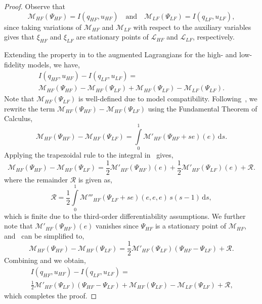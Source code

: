 \documentclass[review,sort&compress]{elsarticle}
\theoremstyle{plain} %
\theoremstyle{definition} %
\providecommand{\DIFaddtex}[1]{{\protect\color{blue} \sf #1}} %
\providecommand{\DIFaddbegin}{} %
\providecommand{\DIFaddend}{} %
\providecommand{\DIFadd}[1]{\texorpdfstring{\DIFaddtex{#1}}{#1}} %
\newcommand{\DIFaddincludegraphics}[2][]{{\color{blue}\fbox{\DIFOincludegraphics[#1]{#2}}}} %
\DeclareRobustCommand{\DIFaddbegin}{\DIFOaddbegin \let\includegraphics\DIFaddincludegraphics} %
\DeclareRobustCommand{\DIFaddend}{\DIFOaddend \let\includegraphics\DIFOincludegraphics} %
\begin{document}
%
\begin{proof}
%
Observe that
%
\begin{equation}
\label{eq:MeqI}
\mathcal{M}_{HF}(\Psi_{HF})=I(q_{HF},u_{HF})\quad\textrm{and}\quad\mathcal{M}_{LF}(\Psi_{LF})=I(q_{LF},u_{LF}),
\end{equation}
%
since taking variations of $\mathcal{M}_{HF}$ and $\mathcal{M}_{LF}$ with respect to the auxiliary variables gives that $\xi_{HF}$ and $\xi_{LF}$ are stationary points of $\mathcal{L}_{HF}$ and $\mathcal{L}_{LF}$, respectively.

Extending the property in  to the augmented Lagrangians for the high- and low-fidelity models, we have,
%
\begin{multline}
\label{eq:repIwithM}
I(q_{HF},u_{HF})-I(q_{LF},u_{LF})=\\\mathcal{M}_{HF}(\Psi_{HF})-\mathcal{M}_{HF}(\Psi_{LF})+\mathcal{M}_{HF}(\Psi_{LF})-\mathcal{M}_{LF}(\Psi_{LF})\textrm{.}
\end{multline}
%
\DIFaddbegin \DIFadd{Note that $\mathcal{M}_{HF}(\Psi_{LF})$ is well-defined due to model compatibility. }\DIFaddend Following~\cite{BecVex05}, we rewrite the term $\mathcal{M}_{HF}(\Psi_{HF})-\mathcal{M}_{HF}(\Psi_{LF})$ using the Fundamental Theorem of Calculus,
%
\begin{equation}
\label{eq:Mantiderivative}
\mathcal{M}_{HF}(\Psi_{HF})-\mathcal{M}_{HF}(\Psi_{LF}) = \int\limits_{0}^{1} \mathcal{M}'_{HF}\left(\Psi_{HF} + se\right)\left(e\right) \, \textrm{d}s.
\end{equation}
%
Applying the trapezoidal rule to the integral in~ gives,
%
\begin{equation}
\label{eq:Mprimetrapezoid}
\mathcal{M}_{HF}(\Psi_{HF})-\mathcal{M}_{HF}(\Psi_{LF}) = \frac{1}{2}\mathcal{M}'_{HF}(\Psi_{HF})(e) + \frac{1}{2}\mathcal{M}'_{HF}(\Psi_{LF})(e) + \mathcal{R}\textrm{.}
\end{equation}
%
where the remainder $\mathcal{R}$ is given as,
%
\begin{equation}
\label{eq:trapezoidremainder}
\mathcal{R} = \frac{1}{2} \int\limits_{0}^{1} \mathcal{M}'''_{HF}\left(\Psi_{LF} + se\right)(e,e,e) \, s(s-1) \, \textrm{d}s,
\end{equation}
%
which is finite due to the third-order differentiability assumptions. We further note that $\mathcal{M}'_{HF}(\Psi_{HF})(e)$ vanishes since $\Psi_{HF}$ is a stationary point of $\mathcal{M}_{HF}$, and~ can be simplified to,
%
\begin{equation}
\label{eq:beckvex}
\mathcal{M}_{HF}(\Psi_{HF})-\mathcal{M}_{HF}(\Psi_{LF}) = \frac{1}{2}\mathcal{M}'_{HF}(\Psi_{LF})(\Psi_{HF}-\Psi_{LF})+\mathcal{R}\textrm{.}
\end{equation}
%
Combining  and  we obtain,
%
\begin{multline}
\label{eq:preadj}
I(q_{HF},u_{HF})-I(q_{LF},u_{LF})=\\\frac{1}{2}\mathcal{M}'_{HF}(\Psi_{LF})(\Psi_{HF}-\Psi_{LF})+\mathcal{M}_{HF}(\Psi_{LF})-\mathcal{M}_{LF}(\Psi_{LF})+\mathcal{R}\textrm{,}
\end{multline}
which completes the proof.
\end{proof}
%
\end{document}
